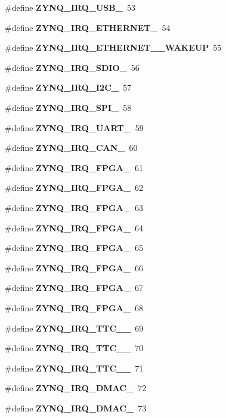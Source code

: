 \begin{DoxyCompactItemize}
\item 
\#define {\bfseries Z\+Y\+N\+Q\+\_\+\+I\+R\+Q\+\_\+\+U\+S\+B\+\_}~53
\item 
\#define {\bfseries Z\+Y\+N\+Q\+\_\+\+I\+R\+Q\+\_\+\+E\+T\+H\+E\+R\+N\+E\+T\+\_}~54
\item 
\#define {\bfseries Z\+Y\+N\+Q\+\_\+\+I\+R\+Q\+\_\+\+E\+T\+H\+E\+R\+N\+E\+T\+\_\+\_\+\+W\+A\+K\+E\+UP}~55
\item 
\#define {\bfseries Z\+Y\+N\+Q\+\_\+\+I\+R\+Q\+\_\+\+S\+D\+I\+O\+\_}~56
\item 
\#define {\bfseries Z\+Y\+N\+Q\+\_\+\+I\+R\+Q\+\_\+\+I2\+C\+\_}~57
\item 
\#define {\bfseries Z\+Y\+N\+Q\+\_\+\+I\+R\+Q\+\_\+\+S\+P\+I\+\_}~58
\item 
\#define {\bfseries Z\+Y\+N\+Q\+\_\+\+I\+R\+Q\+\_\+\+U\+A\+R\+T\+\_}~59
\item 
\#define {\bfseries Z\+Y\+N\+Q\+\_\+\+I\+R\+Q\+\_\+\+C\+A\+N\+\_}~60
\item 
\#define {\bfseries Z\+Y\+N\+Q\+\_\+\+I\+R\+Q\+\_\+\+F\+P\+G\+A\+\_}~61
\item 
\#define {\bfseries Z\+Y\+N\+Q\+\_\+\+I\+R\+Q\+\_\+\+F\+P\+G\+A\+\_}~62
\item 
\#define {\bfseries Z\+Y\+N\+Q\+\_\+\+I\+R\+Q\+\_\+\+F\+P\+G\+A\+\_}~63
\item 
\#define {\bfseries Z\+Y\+N\+Q\+\_\+\+I\+R\+Q\+\_\+\+F\+P\+G\+A\+\_}~64
\item 
\#define {\bfseries Z\+Y\+N\+Q\+\_\+\+I\+R\+Q\+\_\+\+F\+P\+G\+A\+\_}~65
\item 
\#define {\bfseries Z\+Y\+N\+Q\+\_\+\+I\+R\+Q\+\_\+\+F\+P\+G\+A\+\_}~66
\item 
\#define {\bfseries Z\+Y\+N\+Q\+\_\+\+I\+R\+Q\+\_\+\+F\+P\+G\+A\+\_}~67
\item 
\#define {\bfseries Z\+Y\+N\+Q\+\_\+\+I\+R\+Q\+\_\+\+F\+P\+G\+A\+\_}~68
\item 
\#define {\bfseries Z\+Y\+N\+Q\+\_\+\+I\+R\+Q\+\_\+\+T\+T\+C\+\_\+\_}~69
\item 
\#define {\bfseries Z\+Y\+N\+Q\+\_\+\+I\+R\+Q\+\_\+\+T\+T\+C\+\_\+\_}~70
\item 
\#define {\bfseries Z\+Y\+N\+Q\+\_\+\+I\+R\+Q\+\_\+\+T\+T\+C\+\_\+\_}~71
\item 
\#define {\bfseries Z\+Y\+N\+Q\+\_\+\+I\+R\+Q\+\_\+\+D\+M\+A\+C\+\_}~72
\item 
\#define {\bfseries Z\+Y\+N\+Q\+\_\+\+I\+R\+Q\+\_\+\+D\+M\+A\+C\+\_}~73

\end{DoxyCompactItemize}
